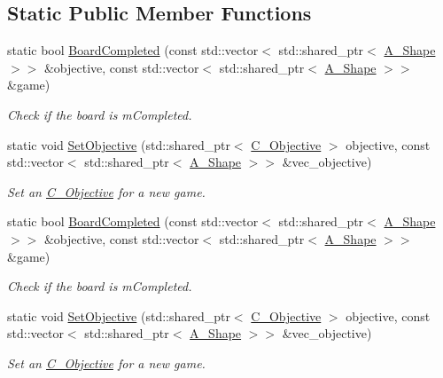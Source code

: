 \subsection*{Static Public Member Functions}
\begin{DoxyCompactItemize}
\item 
static bool \hyperlink{classC__Objective_a5ad5b8ed6a640c86276d34c6a7a58346}{Board\+Completed} (const std\+::vector$<$ std\+::shared\+\_\+ptr$<$ \hyperlink{classA__Shape}{A\+\_\+\+Shape} $>$$>$ \&objective, const std\+::vector$<$ std\+::shared\+\_\+ptr$<$ \hyperlink{classA__Shape}{A\+\_\+\+Shape} $>$$>$ \&game)
\begin{DoxyCompactList}\small\item\em Check if the board is m\+Completed. \end{DoxyCompactList}\item 
static void \hyperlink{classC__Objective_a931d916840c73104815dbf529f9c866c}{Set\+Objective} (std\+::shared\+\_\+ptr$<$ \hyperlink{classC__Objective}{C\+\_\+\+Objective} $>$ objective, const std\+::vector$<$ std\+::shared\+\_\+ptr$<$ \hyperlink{classA__Shape}{A\+\_\+\+Shape} $>$$>$ \&vec\+\_\+objective)
\begin{DoxyCompactList}\small\item\em Set an \hyperlink{classC__Objective}{C\+\_\+\+Objective} for a new game. \end{DoxyCompactList}\item 
static bool \hyperlink{classC__Objective_ad86dc839c04878c1a30ea7b3335896c7}{Board\+Completed} (const std\+::vector$<$ std\+::shared\+\_\+ptr$<$ \hyperlink{classA__Shape}{A\+\_\+\+Shape} $>$$>$ \&objective, const std\+::vector$<$ std\+::shared\+\_\+ptr$<$ \hyperlink{classA__Shape}{A\+\_\+\+Shape} $>$$>$ \&game)
\begin{DoxyCompactList}\small\item\em Check if the board is m\+Completed. \end{DoxyCompactList}\item 
static void \hyperlink{classC__Objective_ae571d4eb2ce6df5f317abfa0a349e8f3}{Set\+Objective} (std\+::shared\+\_\+ptr$<$ \hyperlink{classC__Objective}{C\+\_\+\+Objective} $>$ objective, const std\+::vector$<$ std\+::shared\+\_\+ptr$<$ \hyperlink{classA__Shape}{A\+\_\+\+Shape} $>$$>$ \&vec\+\_\+objective)
\begin{DoxyCompactList}\small\item\em Set an \hyperlink{classC__Objective}{C\+\_\+\+Objective} for a new game. \end{DoxyCompactList}\end{DoxyCompactItemize}


